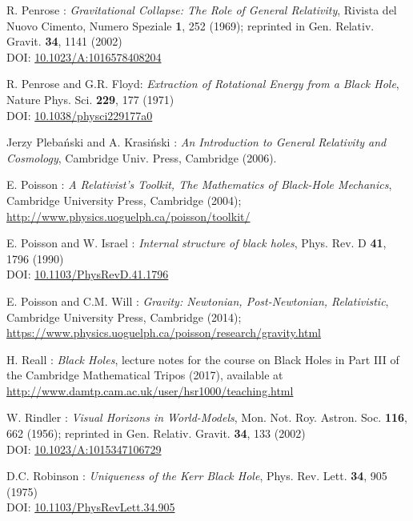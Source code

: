 \begin{thebibliography}{123}
R. Penrose : {\em Gravitational Collapse: The Role of General Relativity},
Rivista del Nuovo Cimento, Numero Speziale {\bf 1}, 252 (1969); reprinted in
Gen. Relativ. Gravit. {\bf 34}, 1141 (2002)\\
DOI: \href{https://doi.org/10.1023/A:1016578408204}{10.1023/A:1016578408204}

R. Penrose and G.R. Floyd: {\em Extraction of Rotational Energy from
a Black Hole},  Nature Phys. Sci. {\bf 229}, 177 (1971)\\
DOI: \href{https://doi.org/10.1038/physci229177a0}{10.1038/physci229177a0}

Jerzy Pleba\'nski and A. Krasi\'nski :
{\em An Introduction to General Relativity and Cosmology},
Cambridge Univ. Press, Cambridge (2006).

E. Poisson : \emph{A Relativist's Toolkit,
The Mathematics of Black-Hole Mechanics},
Cambridge University Press, Cambridge (2004); \\
\url{http://www.physics.uoguelph.ca/poisson/toolkit/}

E. Poisson and W. Israel : {\em Internal structure of black holes},
Phys. Rev. D {\bf 41}, 1796 (1990) \\
DOI: \href{https://doi.org/10.1103/PhysRevD.41.1796}{10.1103/PhysRevD.41.1796}

E. Poisson and C.M. Will : {\em Gravity: Newtonian, Post-Newtonian, Relativistic},
Cambridge University Press, Cambridge (2014); \\
\url{https://www.physics.uoguelph.ca/poisson/research/gravity.html}

H. Reall : {\em Black Holes}, lecture notes for the course on Black Holes in
Part III of the Cambridge Mathematical Tripos (2017), available at \\
\url{http://www.damtp.cam.ac.uk/user/hsr1000/teaching.html}

W. Rindler : {\em Visual Horizons in World-Models},
Mon. Not. Roy. Astron. Soc. {\bf 116}, 662 (1956);
reprinted in Gen. Relativ. Gravit. {\bf 34}, 133 (2002)\\
DOI: \href{https://doi.org/10.1023/A:1015347106729}{10.1023/A:1015347106729}

D.C. Robinson : {\em Uniqueness of the Kerr Black Hole},
Phys. Rev. Lett. {\bf 34}, 905 (1975)\\
DOI: \href{http://dx.doi.org/10.1103/PhysRevLett.34.905}{10.1103/PhysRevLett.34.905}


\end{thebibliography}
